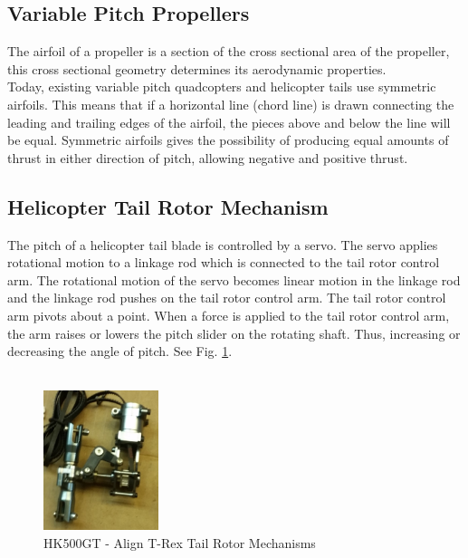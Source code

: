 \subsection{Variable Pitch Propellers}

The airfoil of a propeller is a section of the cross sectional area of the propeller, this cross sectional geometry determines its aerodynamic properties.\\
Today, existing variable pitch quadcopters and helicopter tails use symmetric airfoils. This means that if a horizontal line (chord line) is drawn connecting the leading and trailing edges of the airfoil, the pieces above and below the line will be equal. 
Symmetric airfoils gives the possibility of producing equal amounts of thrust in either direction of pitch, allowing negative and positive thrust. 

\subsection{Helicopter Tail Rotor Mechanism}
The pitch of a helicopter tail blade is controlled by a servo. The servo applies rotational motion to a linkage rod which is connected to the tail rotor control arm. The rotational motion of the servo becomes linear motion in the linkage rod and the linkage rod pushes on the tail rotor control arm. The tail rotor control arm pivots about a point. When a force is applied to the tail rotor control arm, the arm raises or lowers the pitch slider on the rotating shaft. Thus, increasing or decreasing the angle of pitch. See Fig. \ref{fig:helitailrotor}.\\ 
\\
\begin{figure}[H]
\centering
    \includegraphics[width = 0.3\textwidth]{VAPIQ-PICTURES/helitailrotor}
    \caption{HK500GT - Align T-Rex Tail Rotor Mechanisms}
    \label{fig:helitailrotor}    
\end{figure}

